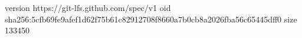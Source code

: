 version https://git-lfs.github.com/spec/v1
oid sha256:5cfb69fe9afef1d62f75b61c82912708f8660a7b0cb8a2026fba56c65445dff0
size 133450

